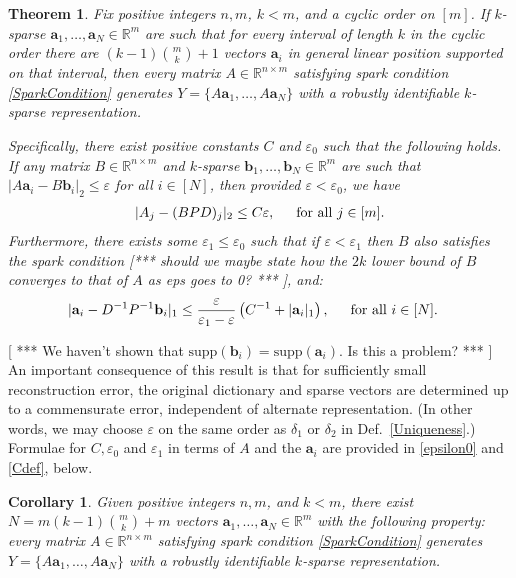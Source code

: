 \documentclass[journal, onecolumn]{IEEEtran}
\newtheorem{theorem}{Theorem}
\newtheorem{corollary}{Corollary}
\begin{document}
\begin{theorem}\label{DeterministicUniquenessTheorem}
Fix positive integers $n, m$, $k < m$, and a cyclic order on $[m]$. If $k$-sparse $\mathbf{a}_1, \ldots, \mathbf{a}_N \in \mathbb{R}^m$ are such that for every interval of length $k$ in the cyclic order there are $(k-1){m \choose k}+1$ vectors $\mathbf{a}_i$ in general linear position supported on that interval, then every matrix $A \in \mathbb{R}^{n \times m}$ satisfying spark condition \eqref{SparkCondition} generates $Y = \{A\mathbf{a}_1, \ldots, A\mathbf{a}_N\}$ with a robustly identifiable $k$-sparse representation.

Specifically, there exist positive constants $C$ and $\varepsilon_0$ such that the following holds. If any matrix $B \in \mathbb{R}^{n \times m}$ and $k$-sparse $\mathbf{b}_1, \ldots, \mathbf{b}_N \in \mathbb{R}^m$ are such that $|A\mathbf{a}_i - B\mathbf{b}_i|_2 \leq \varepsilon$ for all $i \in [N]$, then provided $\varepsilon < \varepsilon_0$, we have
\begin{align}\label{Cstable}
|A_j-(BPD)_j|_2 \leq C\varepsilon,\indent  \text{for all } j \in [m].
\end{align}
Furthermore, there exists some $\varepsilon_1 \leq \varepsilon_0$ such that if $\varepsilon < \varepsilon_1$ then $B$ also satisfies the spark condition [*** should we maybe state how the $2k$ lower bound of $B$ converges to that of $A$ as eps goes to 0? *** ], and:
\begin{align}\label{b-PDa}
|\mathbf{a}_i - D^{-1}P^{-1}\mathbf{b}_i|_1 &\leq \frac{\varepsilon }{\varepsilon_1 - \varepsilon} \left( C^{-1}+|\mathbf{a}_i|_1 \right),\indent  \text{for all } i \in [N].
\end{align}
\end{theorem}
[ *** We haven't shown that $\text{supp}(\mathbf{b}_i) = \text{supp}(\mathbf{a}_i)$. Is this a problem? *** ]
An important consequence of this result is that for sufficiently small reconstruction error, the original dictionary and sparse vectors are determined up to a commensurate error, independent of alternate representation.  (In other words, we may choose $\varepsilon$ on the same order as $\delta_1$ or $\delta_2$ in Def.~\ref{Uniqueness}.) Formulae for  $C, \varepsilon_0$ and $\varepsilon_1$ in terms of $A$ and the $\mathbf{a}_i$ are provided in \eqref{epsilon0} and \eqref{Cdef}, below. 

\begin{corollary}\label{DeterministicUniquenessCorollary}
Given positive integers $n, m$, and $k < m$, there exist $N =  m(k-1){m \choose k}+m$ vectors $\mathbf{a}_1, \ldots, \mathbf{a}_N \in \mathbb{R}^m$ with the following property: every matrix $A \in \mathbb{R}^{n \times m}$ satisfying spark condition \eqref{SparkCondition} generates $Y = \{A\mathbf{a}_1, \ldots, A\mathbf{a}_N\}$ with a robustly identifiable $k$-sparse representation.
\end{corollary}
\end{document}

